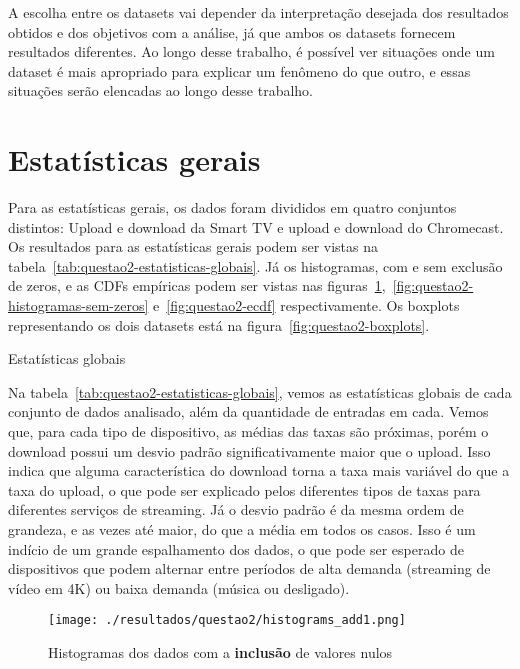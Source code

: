 \documentclass{article}
\begin{document}
A escolha entre os datasets vai depender da interpretação desejada dos resultados obtidos e dos objetivos com a análise, já que ambos os datasets fornecem resultados diferentes. Ao longo desse trabalho, é possível ver situações onde um dataset é mais apropriado para explicar um fenômeno do que outro, e essas situações serão elencadas ao longo desse trabalho.

\section{Estatísticas gerais}
\label{sec:estatistica-geral}

Para as estatísticas gerais, os dados foram divididos em quatro conjuntos distintos: Upload e download da Smart TV e upload e download do Chromecast. Os resultados para as estatísticas gerais podem ser vistas na tabela~\ref{tab:questao2-estatisticas-globais}. Já os histogramas, com e sem exclusão de zeros, e as CDFs empíricas podem ser vistas nas figuras~\ref{fig:questao2-histogramas-com-zeros},~\ref{fig:questao2-histogramas-sem-zeros} e~\ref{fig:questao2-ecdf} respectivamente. Os boxplots representando os dois datasets está na figura~\ref{fig:questao2-boxplots}.

\begin{table}[h]
	\centering
	
	\caption{Estatísticas globais}
	\label{tab:questao2-estatisticas-globais}
\end{table}


Na tabela~\ref{tab:questao2-estatisticas-globais}, vemos as estatísticas globais de cada conjunto de dados analisado, além da quantidade de entradas em cada. Vemos que, para cada tipo de dispositivo, as médias das taxas são próximas, porém o download possui um desvio padrão significativamente maior que o upload. Isso indica que alguma característica do download torna a taxa mais variável do que a taxa do upload, o que pode ser explicado pelos diferentes tipos de taxas para diferentes serviços de streaming. Já o desvio padrão é da mesma ordem de grandeza, e as vezes até maior, do que a média em todos os casos. Isso é um indício de um grande espalhamento dos dados, o que pode ser esperado de dispositivos que podem alternar entre períodos de alta demanda (streaming de vídeo em 4K) ou baixa demanda (música ou desligado).

\begin{figure}[h]
	\centering
	\caption{Histogramas dos dados com a \textbf{inclusão} de valores nulos}
	\texttt{[image: ./resultados/questao2/histograms\_add1.png]}
	\label{fig:questao2-histogramas-com-zeros}
\end{figure}
\end{document}

